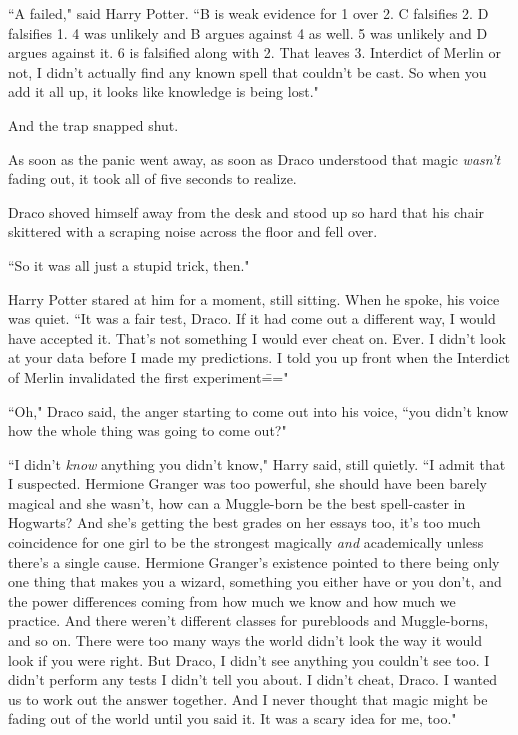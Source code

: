 \vspace{1\baselineskip}

``A failed," said Harry Potter. ``B is weak evidence for 1 over 2. C falsifies 2. D falsifies 1. 4 was unlikely and B argues against 4 as well. 5 was unlikely and D argues against it. 6 is falsified along with 2. That leaves 3. Interdict of Merlin or not, I didn't actually find any known spell that couldn't be cast. So when you add it all up, it looks like knowledge is being lost."

And the trap snapped shut.

As soon as the panic went away, as soon as Draco understood that magic \emph{wasn't} fading out, it took all of five seconds to realize.

Draco shoved himself away from the desk and stood up so hard that his chair skittered with a scraping noise across the floor and fell over.

``So it was all just a stupid trick, then."

Harry Potter stared at him for a moment, still sitting. When he spoke, his voice was quiet. ``It was a fair test, Draco. If it had come out a different way, I would have accepted it. That's not something I would ever cheat on. Ever. I didn't look at your data before I made my predictions. I told you up front when the Interdict of Merlin invalidated the first experiment\==="

``Oh," Draco said, the anger starting to come out into his voice, ``you didn't know how the whole thing was going to come out?"

``I didn't \emph{know} anything you didn't know," Harry said, still quietly. ``I admit that I suspected. Hermione Granger was too powerful, she should have been barely magical and she wasn't, how can a Muggle-born be the best spell-caster in Hogwarts? And she's getting the best grades on her essays too, it's too much coincidence for one girl to be the strongest magically \emph{and} academically unless there's a single cause. Hermione Granger's existence pointed to there being only one thing that makes you a wizard, something you either have or you don't, and the power differences coming from how much we know and how much we practice. And there weren't different classes for purebloods and Muggle-borns, and so on. There were too many ways the world didn't look the way it would look if you were right. But Draco, I didn't see anything you couldn't see too. I didn't perform any tests I didn't tell you about. I didn't cheat, Draco. I wanted us to work out the answer together. And I never thought that magic might be fading out of the world until you said it. It was a scary idea for me, too."

